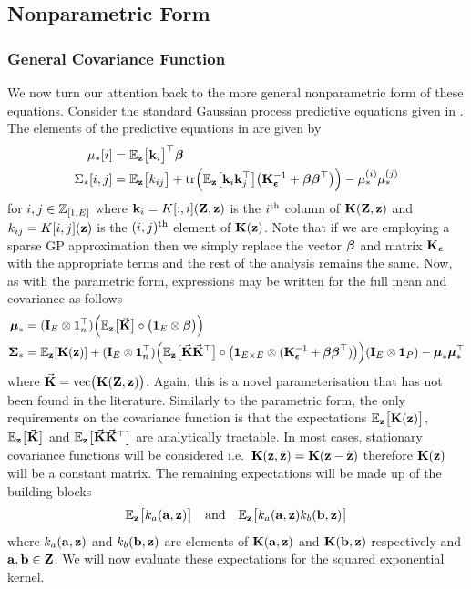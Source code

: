 \subsection{Nonparametric Form}

\subsubsection{General Covariance Function}
We now turn our attention back to the more general nonparametric form of these equations. Consider the standard Gaussian process predictive equations given in . The elements of the predictive equations in  are given by 
\begin{align*}
\mu_*[i] &= 
\EE_{\bz}\big[\bk_{i}\big]\T \bBe \\
%
\Sigma_*[i,j] &= 
\EE_{\bz}\big[k_{ij}\big] + \tr\Big(\EE_{\bz}\big[\bk_{i}\bk_{j}\T\big]
\big(\bK_{\be}^{-1} + \bBe\bBe\T\big) \Big) 
- \mu^{(i)}_* \mu^{(j)}_*
\end{align*}
for $i,j \in \mathbb{Z}_{[1,E]}$ where $\mathbf{k}_{i} = K[:,i](\mathbf{Z},\mathbf{z})$ is the $i^{\text{th}}$ column of $\mathbf{K}(\mathbf{Z},\mathbf{z})$ and $k_{ij}=K[i,j](\mathbf{z})$ is the $(i,j)^{\text{th}}$ element of $\mathbf{K}(\mathbf{z})$. 
Note that if we are employing a sparse GP approximation then we simply replace the vector $\boldsymbol{\beta}$ and matrix $\mathbf{K}_{\boldsymbol{\epsilon}}$ with the appropriate terms and the rest of the analysis remains the same.
Now, as with the parametric form, expressions may be written for the full mean and covariance as follows
\begin{align}
\bm_* &= (\bI_E \otimes \mathbf{1}_n\T)
\Big( \EE_{\bz}\big[\vec{\bK}\big] \circ \big(\mathbf{1}_E \otimes \bBe \big) \Big)
 \label{eqn:uncgpM}  \\
%
\bS_* &= 
\EE_\bz[\bK(\bz)] + 
 (\bI_E \otimes \mathbf{1}_n\T)
\Big( \EE_{\bz}\big[\vec{\bK}\vec{\bK}\T\big]  \circ 
\big(\mathbf{1}_{E\times E} \otimes (\bK_{\be}^{-1} + \bBe\bBe\T) \big) \Big) 
 (\bI_E \otimes \mathbf{1}_P)
- \bm_*\bm_*\T
\label{eqn:uncgpV}
\end{align}
where $\vec{\mathbf{K}} = \mathrm{vec}\big( \mathbf{K}(\mathbf{Z},\mathbf{z}) \big)$. Again, this is a novel parameterisation that has not been found in the literature.
%
Similarly to the parametric form, the only requirements on the covariance function is that the expectations $\mathbb{E}_{\mathbf{z}}\big[\mathbf{K}(\mathbf{z})\big]$, $\mathbb{E}_{\mathbf{z}}\big[\vec{\mathbf{K}}\big]$ and $\mathbb{E}_{\mathbf{z}}\big[\vec{\mathbf{K}}\vec{\mathbf{K}}^\top\big]$ are analytically tractable. In most cases, stationary covariance functions will be considered i.e.\ $\mathbf{K}(\mathbf{z},\tilde{\mathbf{z}}) = \mathbf{K}(\mathbf{z}-\tilde{\mathbf{z}})$ therefore $\mathbf{K}(\mathbf{z})$ will be a constant matrix. The remaining expectations will be made up of the building blocks
\begin{align}
\mathbb{E}_{\mathbf{z}}\big[ k_a(\mathbf{a},\mathbf{z}) \big] \quad \text{and} \quad
\mathbb{E}_{\mathbf{z}}\big[ k_a(\mathbf{a},\mathbf{z})k_b(\mathbf{b},\mathbf{z}) \big] \label{eqn:exps}
\end{align}
where $k_a(\mathbf{a},\mathbf{z})$ and $k_b(\mathbf{b},\mathbf{z})$ are elements of $\mathbf{K}(\mathbf{a},\mathbf{z})$ and $\mathbf{K}(\mathbf{b},\mathbf{z})$ respectively and $\mathbf{a},\mathbf{b} \in \mathbf{Z}$. We will now evaluate these expectations for the squared exponential kernel.







